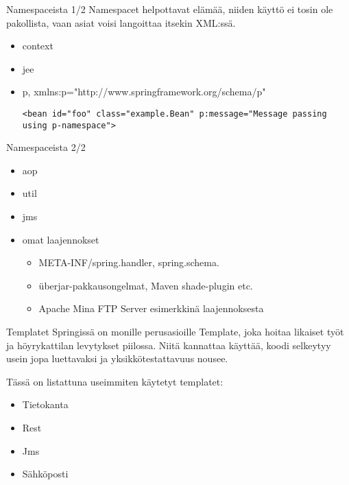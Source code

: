 \documentclass[hyperref={pdfauthor=\AUTHOR},14pt]{beamer}
\author{\AUTHOR}
\title[\TITLE]{\TITLE}
\date{\DATE}
\begin{document}
\begin{frame}[plain]
\titlepage
\end{frame}

\begin{frame}[t, fragile]{Namespaceista 1/2}
Namespacet helpottavat elämää, niiden käyttö ei tosin ole pakollista,
vaan asiat voisi langoittaa itsekin XML:ssä.
\begin{itemize}
\item context
\item jee
\item p, xmlns:p="http://www.springframework.org/schema/p"\\
\begin{lstlisting}
<bean id="foo" class="example.Bean" p:message="Message passing using p-namespace">
\end{lstlisting}
\end{itemize}
\end{frame}

\begin{frame}[t, fragile]{Namespaceista 2/2}
\begin{itemize}
\item aop
\item util
\item jms
\item omat laajennokset
\begin{itemize}
\item  META-INF/spring.handler, spring.schema. 
\item überjar-pakkausongelmat, Maven shade-plugin etc.
\item Apache Mina FTP Server esimerkkinä laajennoksesta
\end{itemize}
\end{itemize}
\end{frame}

\begin{frame}{Templatet}
Springissä on monille perusasioille Template, joka hoitaa likaiset työt ja höyrykattilan levytykset piilossa. Niitä kannattaa käyttää, koodi selkeytyy usein jopa luettavaksi ja yksikkötestattavuus nousee.

Tässä on listattuna useimmiten käytetyt templatet:
\begin{itemize}
\item Tietokanta
\item Rest
\item Jms
\item Sähköposti
\end{itemize}
\end{frame}
\end{document}
